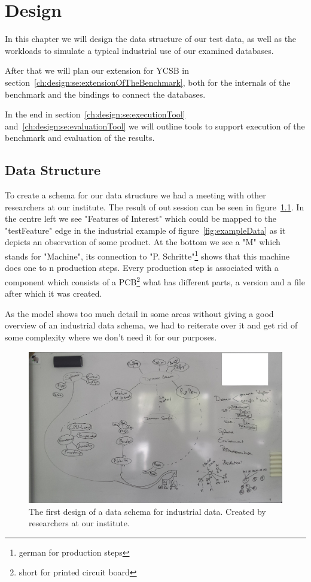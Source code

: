 \chapter{Design}
\label{ch:design}
In this chapter we will design the data structure of our test data,
as well as the workloads to simulate a typical industrial use of our examined databases.

After that we will plan our extension for YCSB in section~\ref{ch:design:se:extensionOfTheBenchmark},
both for the internals of the benchmark and the bindings to connect the databases.

In the end in section~\ref{ch:design:se:executionTool} and~\ref{ch:design:se:evaluationTool} we will outline tools to support execution of the benchmark and evaluation of the results.

\section{Data Structure}
\label{ch:design:se:dataStructure}
To create a schema for our data structure we had a meeting with other researchers at our institute.
The result of out session can be seen in figure~\ref{fig:firstDesignOfSchema}.
In the centre left we see "Features of Interest" which could be mapped to the "testFeature" edge in the industrial example of figure~\ref{fig:exampleData} as it depicts an observation of some product.
At the bottom we see a "M" which stands for "Machine",
its connection to "P. Schritte"\footnote{german for production steps} shows that this machine does one to n production steps.
Every production step is associated with a component which consists of a PCB\footnote{short for printed circuit board} what has different parts,
a version and a file after which it was created.

As the model shows too much detail in some areas without giving a good overview of an industrial data schema,
we had to reiterate over it and get rid of some complexity where we don't need it for our purposes.

\begin{figure}
  \centering
  \includegraphics[width=\textwidth]{images/firstDesignOfSchema}
  \caption{The first design of a data schema for industrial data. Created by researchers at our institute.}
  \label{fig:firstDesignOfSchema}
\end{figure}

